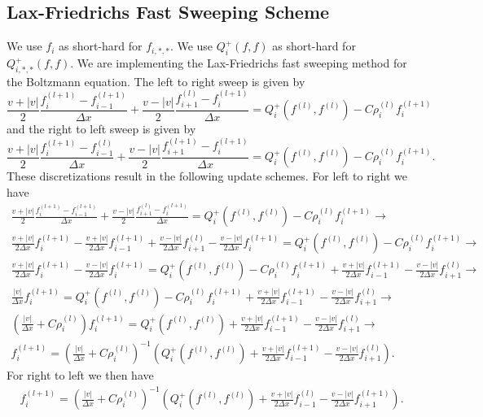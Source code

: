 \documentclass{article}
\begin{document}
\subsection{Lax-Friedrichs Fast Sweeping Scheme}
We use $f_i$ as short-hard for $f_{i,*,*}$. We use $Q^+_i(f,f)$ as short-hard for $Q^+_{i,*,*}(f,f)$.  We are implementing the Lax-Friedrichs fast sweeping method for the Boltzmann equation. The left to right sweep is given by
\[
  \frac{v + |v|}{2} \frac{f_i^{(l+1)} - f_{i-1}^{(l+1)}}{\Delta x} + \frac{v - |v|}{2} \frac{f_{i+1}^{(l)} - f_{i}^{(l+1)}}{\Delta x} = Q_i^+(f^{(l)}, f^{(l)}) - C \rho_i^{(l)} f_i^{(l+1)}
\]
and the right to left sweep is given by
\[
  \frac{v + |v|}{2} \frac{f_i^{(l+1)} - f_{i-1}^{(l)}}{\Delta x} + \frac{v - |v|}{2} \frac{f_{i+1}^{(l+1)} - f_{i}^{(l+1)}}{\Delta x} = Q_i^+(f^{(l)}, f^{(l)}) - C \rho_i^{(l)} f_i^{(l+1)}.
\]
These discretizations result in the following update schemes. For left to right we have 
\begin{gather*}
  \frac{v + |v|}{2} \frac{f_i^{(l+1)} - f_{i-1}^{(l+1)}}{\Delta x} + \frac{v - |v|}{2} \frac{f_{i+1}^{(l)} - f_{i}^{(l+1)}}{\Delta x} = Q_i^+(f^{(l)}, f^{(l)}) - C \rho_i^{(l)} f_i^{(l+1)} \to \\
  \frac{v + |v|}{2 \Delta x} f_{i}^{(l+1)} - \frac{v + |v|}{2 \Delta x} f_{i-1}^{(l+1)} + \frac{v - |v|}{2 \Delta x} f_{i+1}^{(l)} - \frac{v - |v|}{2 \Delta x} f_{i}^{(l+1)} = Q_i^+(f^{(l)}, f^{(l)}) - C \rho_i^{(l)} f_i^{(l+1)} \to \\
  \frac{v + |v|}{2 \Delta x} f_{i}^{(l+1)} - \frac{v - |v|}{2 \Delta x} f_{i}^{(l+1)} = Q_i^+(f^{(l)}, f^{(l)}) - C \rho_i^{(l)} f_i^{(l+1)} + \frac{v + |v|}{2 \Delta x} f_{i-1}^{(l+1)} - \frac{v - |v|}{2 \Delta x} f_{i+1}^{(l)} \to \\
  \frac{|v|}{\Delta x} f_{i}^{(l+1)} = Q_i^+(f^{(l)}, f^{(l)}) - C \rho_i^{(l)} f_i^{(l+1)} + \frac{v + |v|}{2 \Delta x} f_{i-1}^{(l+1)} - \frac{v - |v|}{2 \Delta x} f_{i+1}^{(l)} \to \\
  \left(\frac{|v|}{\Delta x} + C \rho_i^{(l)} \right) f_{i}^{(l+1)} = Q_i^+(f^{(l)}, f^{(l)}) + \frac{v + |v|}{2 \Delta x} f_{i-1}^{(l+1)} - \frac{v - |v|}{2 \Delta x} f_{i+1}^{(l)} \to \\
  f_{i}^{(l+1)} = \left(\frac{|v|}{\Delta x} + C \rho_i^{(l)} \right)^{-1} \left( Q_i^+(f^{(l)}, f^{(l)}) + \frac{v + |v|}{2 \Delta x} f_{i-1}^{(l+1)} - \frac{v - |v|}{2 \Delta x} f_{i+1}^{(l)} \right).
\end{gather*}
For right to left we then have
\begin{gather*}
  f_{i}^{(l+1)} = \left(\frac{|v|}{\Delta x} + C \rho_i^{(l)} \right)^{-1} \left( Q_i^+(f^{(l)}, f^{(l)}) + \frac{v + |v|}{2 \Delta x} f_{i-1}^{(l)} - \frac{v - |v|}{2 \Delta x} f_{i+1}^{(l+1)} \right).
\end{gather*}
\end{document}
